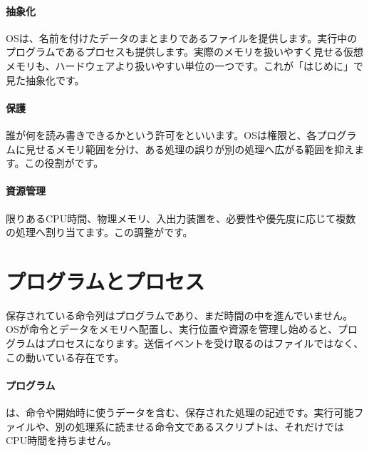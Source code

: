 \begingroup
  \centering
  \vspace{4mm}
\begingroup
\paragraph{抽象化}
        OSは、名前を付けたデータのまとまりであるファイルを提供します。実行中のプログラムであるプロセスも提供します。実際のメモリを扱いやすく見せる仮想メモリも、ハードウェアより扱いやすい単位の一つです。これが「はじめに」で見た抽象化です。

\par
\endgroup
\medskip
\begingroup
\paragraph{保護}
        誰が何を読み書きできるかという許可をといいます。OSは権限と、各プログラムに見せるメモリ範囲を分け、ある処理の誤りが別の処理へ広がる範囲を抑えます。この役割がです。

\par
\endgroup
\medskip
\begingroup
\paragraph{資源管理}
        限りあるCPU時間、物理メモリ、入出力装置を、必要性や優先度に応じて複数の処理へ割り当てます。この調整がです。

\par
\endgroup
\par
\endgroup


\section{プログラムとプロセス}
\label{sec:03-runtime-data-02}

保存されている命令列はプログラムであり、まだ時間の中を進んでいません。OSが命令とデータをメモリへ配置し、実行位置や資源を管理し始めると、プログラムはプロセスになります。送信イベントを受け取るのはファイルではなく、この動いている存在です。

\paragraph{プログラム}
は、命令や開始時に使うデータを含む、保存された処理の記述です。実行可能ファイルや、別の処理系に読ませる命令文であるスクリプトは、それだけではCPU時間を持ちません。

